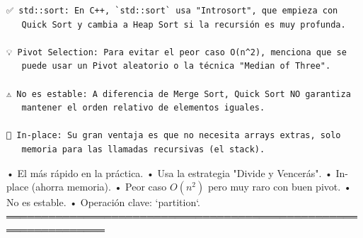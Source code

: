 \begin{lstlisting}
✅ std::sort: En C++, `std::sort` usa "Introsort", que empieza con 
   Quick Sort y cambia a Heap Sort si la recursión es muy profunda.

💡 Pivot Selection: Para evitar el peor caso O(n^2), menciona que se 
   puede usar un Pivot aleatorio o la técnica "Median of Three".

⚠️ No es estable: A diferencia de Merge Sort, Quick Sort NO garantiza
   mantener el orden relativo de elementos iguales.

🔑 In-place: Su gran ventaja es que no necesita arrays extras, solo 
   memoria para las llamadas recursivas (el stack).
\end{lstlisting}

\begin{dsaresumen}

• El más rápido en la práctica.
• Usa la estrategia "Divide y Vencerás".
• In-place (ahorra memoria).
• Peor caso $O(n^2)$ pero muy raro con buen pivot.
• No es estable.
• Operación clave: `partition`.
════════════════════════════════════════════════════════════════

\end{dsaresumen}


